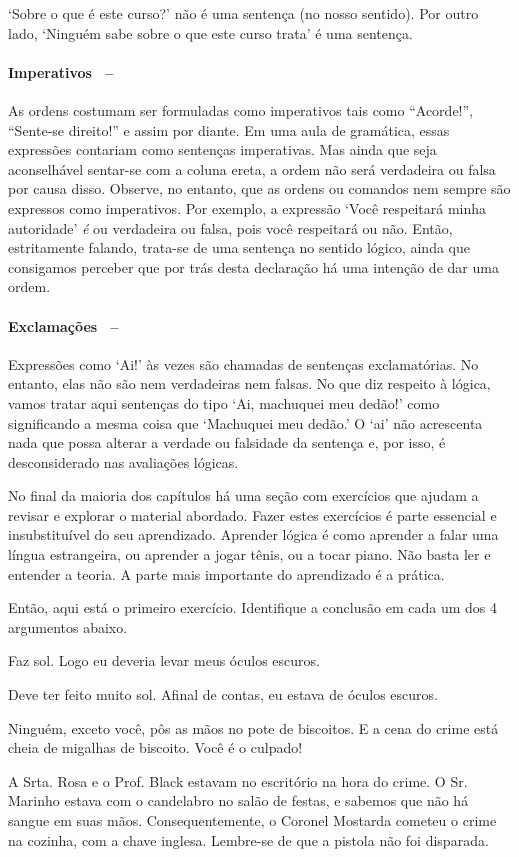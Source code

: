 `Sobre o que é este curso?' não é uma sentença (no nosso sentido).
Por outro lado, `Ninguém sabe sobre o que este curso trata' é uma sentença.

\paragraph{Imperativos \ --}As ordens costumam ser formuladas como imperativos tais como ``Acorde!'', ``Sente-se direito!'' e assim por diante.
Em uma aula de gramática, essas expressões contariam como sentenças imperativas.
Mas ainda que seja aconselhável sentar-se com a coluna ereta, a ordem não será verdadeira ou falsa por causa disso.
Observe, no entanto, que as ordens ou comandos nem sempre são expressos como imperativos.
Por exemplo, a expressão `Você respeitará minha autoridade' \emph{é} ou verdadeira ou falsa, pois você respeitará ou não.
Então, estritamente falando, trata-se de uma sentença no sentido lógico, ainda que consigamos perceber que por trás desta declaração há uma intenção de dar uma ordem.

\paragraph{Exclamações \ --}Expressões como `Ai!' às vezes são chamadas de sentenças exclamatórias.
No entanto, elas não são nem verdadeiras nem falsas.
No que diz respeito à lógica, vamos tratar aqui sentenças do tipo `Ai, machuquei meu dedão!' como significando a mesma coisa que `Machuquei meu dedão.'
O `ai' não acrescenta nada que possa alterar a verdade ou falsidade da sentença e, por isso, é desconsiderado nas avaliações lógicas.


\practiceproblems
No final da maioria dos capítulos há uma seção com exercícios que ajudam a revisar e explorar o material abordado.
Fazer estes exercícios é parte essencial e insubstituível do seu aprendizado.
Aprender lógica é como aprender a falar uma língua estrangeira, ou aprender a jogar tênis, ou a tocar piano.
Não basta ler e entender a teoria.
A parte mais importante do aprendizado é a prática.

\medskip


Então, aqui está o primeiro exercício. Identifique a conclusão em cada um dos 4 argumentos abaixo.
\begin{earg}
	\item Faz sol. Logo eu deveria levar meus óculos escuros.
	\item Deve ter feito muito sol. Afinal de contas, eu estava de óculos escuros.
	\item Ninguém, exceto você, pôs as mãos no pote de biscoitos.
	E a cena do crime está cheia de migalhas de biscoito.
	Você é o culpado!
	\item A Srta. Rosa e o Prof. Black estavam no escritório na hora do crime.
	O Sr. Marinho estava com o candelabro no salão de festas,
	e sabemos que não há sangue em suas mãos.
	Consequentemente, o Coronel Mostarda cometeu o crime na cozinha, com a chave inglesa.
	Lembre-se de que a pistola não foi disparada.
\end{earg}



